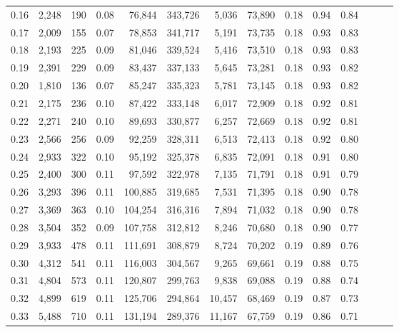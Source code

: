 \begin{tabular}{rrrrrrrrrrrrrr}
0.16 &   2,248 &    190 &  0.08 &   76,844 &  343,726 &   5,036 &  73,890 &  0.18 &  0.94 &      0.84 \\
0.17 &   2,009 &    155 &  0.07 &   78,853 &  341,717 &   5,191 &  73,735 &  0.18 &  0.93 &      0.83 \\
0.18 &   2,193 &    225 &  0.09 &   81,046 &  339,524 &   5,416 &  73,510 &  0.18 &  0.93 &      0.83 \\
0.19 &   2,391 &    229 &  0.09 &   83,437 &  337,133 &   5,645 &  73,281 &  0.18 &  0.93 &      0.82 \\
0.20 &   1,810 &    136 &  0.07 &   85,247 &  335,323 &   5,781 &  73,145 &  0.18 &  0.93 &      0.82 \\
0.21 &   2,175 &    236 &  0.10 &   87,422 &  333,148 &   6,017 &  72,909 &  0.18 &  0.92 &      0.81 \\
0.22 &   2,271 &    240 &  0.10 &   89,693 &  330,877 &   6,257 &  72,669 &  0.18 &  0.92 &      0.81 \\
0.23 &   2,566 &    256 &  0.09 &   92,259 &  328,311 &   6,513 &  72,413 &  0.18 &  0.92 &      0.80 \\
0.24 &   2,933 &    322 &  0.10 &   95,192 &  325,378 &   6,835 &  72,091 &  0.18 &  0.91 &      0.80 \\
0.25 &   2,400 &    300 &  0.11 &   97,592 &  322,978 &   7,135 &  71,791 &  0.18 &  0.91 &      0.79 \\
0.26 &   3,293 &    396 &  0.11 &  100,885 &  319,685 &   7,531 &  71,395 &  0.18 &  0.90 &      0.78 \\
0.27 &   3,369 &    363 &  0.10 &  104,254 &  316,316 &   7,894 &  71,032 &  0.18 &  0.90 &      0.78 \\
0.28 &   3,504 &    352 &  0.09 &  107,758 &  312,812 &   8,246 &  70,680 &  0.18 &  0.90 &      0.77 \\
0.29 &   3,933 &    478 &  0.11 &  111,691 &  308,879 &   8,724 &  70,202 &  0.19 &  0.89 &      0.76 \\
0.30 &   4,312 &    541 &  0.11 &  116,003 &  304,567 &   9,265 &  69,661 &  0.19 &  0.88 &      0.75 \\
0.31 &   4,804 &    573 &  0.11 &  120,807 &  299,763 &   9,838 &  69,088 &  0.19 &  0.88 &      0.74 \\
0.32 &   4,899 &    619 &  0.11 &  125,706 &  294,864 &  10,457 &  68,469 &  0.19 &  0.87 &      0.73 \\
0.33 &   5,488 &    710 &  0.11 &  131,194 &  289,376 &  11,167 &  67,759 &  0.19 &  0.86 &      0.71 \\

\end{tabular}
